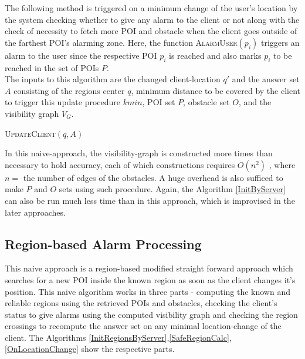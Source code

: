 \documentclass{sig-alternate}
\begin{document}
The following method is triggered on a minimum change of the user's location by the system checking whether to give any alarm to the client or not along with the check of necessity to fetch more POI and obstacle when the client goes outside of the farthest POI's alarming zone.
Here, the function \textsc{AlarmUser}$(p_i)$ triggers an alarm to the user since the respective POI $p_i$ is reached and also marks $p_i$ to be reached in the set of POIs $P$. \\
The inputs to this algorithm are the changed client-location $q'$ and the answer set $A$ consisting of the regions center $q$, minimum distance to be covered by the client to trigger this update procedure $k{min}$, POI set $P$, obstacle set $O$, and the visibility graph $V_G$.
 
\begin{algorithm}
\caption{\textsc{UpdateClient}$(q, A)$}

    
	  {
	}
\label{UpdateClient}
\end{algorithm}


In this naive-approach, the visibility-graph is constructed more times than necessary to hold accuracy, each of which constructions requires $O(n^2)$ \cite{mur}, where $n =$ the number of edges of the obstacles. A huge overhead is also sufficed to make $P$ and $O$ sets using such procedure. Again, the Algorithm \ref{InitByServer} can also be run much less time than in this approach, which is improvised in the later approaches.


\subsection{Region-based Alarm Processing}
This naive approach is a region-based modified straight forward approach which searches for a new POI inside the known region as soon as the client changes it's position.
This naive algorithm works in three parts - computing the known and reliable regions using the retrieved POIs and obstacles, checking the client's status to give alarms using the computed visibility graph and checking the region crossings to recompute the answer set on any minimal location-change of the client. The Algorithms \ref{InitRegionsByServer},\ref{SafeRegionCalc},\ref{OnLocationChange} show the respective parts.
\end{document}
